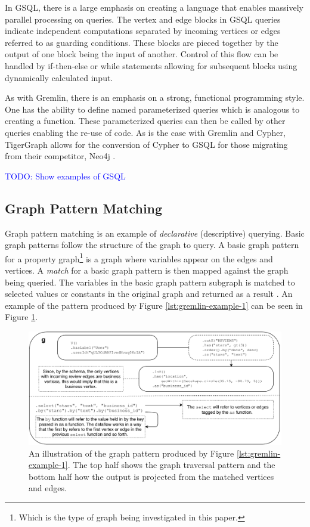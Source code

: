 In GSQL, there is a large emphasis on creating a language that enables massively parallel processing on queries. The vertex and edge blocks in GSQL queries indicate independent computations separated by incoming vertices or edges referred to as guarding conditions. These blocks are pieced together by the output of one block being the input of another. Control of this flow can be handled by if-then-else or while statements allowing for subsequent blocks using dynamically calculated input.

As with Gremlin, there is an emphasis on a strong, functional programming style. One has the ability to define named parameterized queries which is analogous to creating a function. These parameterized queries can then be called by other queries enabling the re-use of code. As is the case with Gremlin and Cypher, TigerGraph allows for the conversion of Cypher to GSQL for those migrating from their competitor, Neo4j \cite{tigergraph-infoworld}.

\textcolor{blue}{TODO: Show examples of GSQL}

\subsection{Graph Pattern Matching}

Graph pattern matching is an example of \emph{declarative} (descriptive) querying. Basic graph patterns follow the structure of the graph to query. A basic graph pattern for a property graph\footnote{Which is the type of graph being investigated in this paper.} is a graph where variables appear on the edges and vertices. A \emph{match} for a basic graph pattern is then mapped against the graph being queried. The variables in the basic graph pattern subgraph is matched to selected values or constants in the original graph and returned as a result \cite{foundations-of-modern-gql}. An example of the pattern produced by Figure \ref{lst:gremlin-example-1} can be seen in Figure \ref{fig:gremlin-pattern}.

\begin{figure}[h!]
    \centering
    \includegraphics[width=16cm]{img/gremlin-pattern.pdf}
    \caption{An illustration of the graph pattern produced by Figure \ref{lst:gremlin-example-1}. The top half shows the graph traversal pattern and the bottom half how the output is projected from the matched vertices and edges.}
    \label{fig:gremlin-pattern}
\end{figure}

